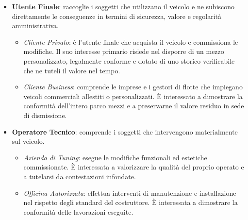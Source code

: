 \begin{itemize}
    \item \textbf{Utente Finale}: raccoglie i soggetti che utilizzano il veicolo e ne subiscono direttamente le conseguenze in termini di sicurezza, valore e regolarit\`a amministrativa.
    \begin{itemize}
        \item \textit{Cliente Privato}: \`e l'utente finale che acquista il veicolo e commissiona le modifiche. Il suo interesse primario risiede nel disporre di un mezzo personalizzato, legalmente conforme e dotato di uno storico verificabile che ne tuteli il valore nel tempo.
        \item \textit{Cliente Business}: comprende le imprese e i gestori di flotte che impiegano veicoli commerciali allestiti o personalizzati. \`E interessato a dimostrare la conformit\`a dell'intero parco mezzi e a preservarne il valore residuo in sede di dismissione.
    \end{itemize}

    \item \textbf{Operatore Tecnico}: comprende i soggetti che intervengono materialmente sul veicolo.
    \begin{itemize}
        \item \textit{Azienda di Tuning}: esegue le modifiche funzionali ed estetiche commissionate. \`E interessata a valorizzare la qualit\`a del proprio operato e a tutelarsi da contestazioni infondate.
        \item \textit{Officina Autorizzata}: effettua interventi di manutenzione e installazione nel rispetto degli standard del costruttore. \`E interessata a dimostrare la conformit\`a delle lavorazioni eseguite.
    \end{itemize}


\end{itemize}
